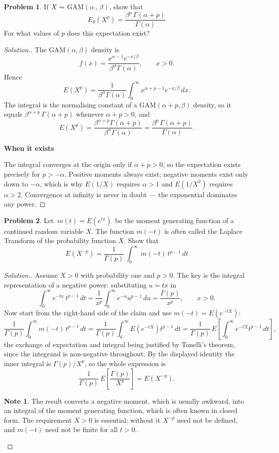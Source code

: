\documentclass[12pt,a4paper]{report}
\theoremstyle{definition}
\newtheorem*{note}{Note}
\newcommand{\subhead}[1]{%
  \par\medskip\noindent\textbf{#1}\par\nobreak\smallskip}
\newtheorem{problemx}{Problem}[section]
\newenvironment{problem}{\begin{problemx}}{\end{problemx}}
\newenvironment{solution}
  {\renewcommand{\qedsymbol}{}\begin{proof}[\textit{Solution}.]}
  {\end{proof}}
\begin{document}
\begin{problem}
\label{prob:gammamoments}
If $X\thicksim$ GAM$(\alpha\, , \, \beta)$, show that 
\[E_{\theta}\left(X^p\right) = \frac{\beta^p\, \Gamma\left(\alpha + p\right)}{\Gamma (\alpha)}\]
For what values of $p$ does this expectation exist?
\end{problem}

\begin{solution}
The GAM$(\alpha,\beta)$ density is
\[f(x) = \frac{x^{\alpha-1}e^{-x/\beta}}{\beta^{\alpha}\Gamma(\alpha)},\qquad x>0 .\]
Hence
\[E\left(X^{p}\right)
= \frac{1}{\beta^{\alpha}\Gamma(\alpha)}\int_0^{\infty} x^{\alpha+p-1}e^{-x/\beta}\,dx .\]
The integral is the normalising constant of a GAM$(\alpha+p,\beta)$ density, so
it equals $\beta^{\alpha+p}\,\Gamma(\alpha+p)$ whenever $\alpha+p>0$, and
\[E\left(X^{p}\right) = \frac{\beta^{\alpha+p}\Gamma(\alpha+p)}{\beta^{\alpha}\Gamma(\alpha)}
= \frac{\beta^{p}\,\Gamma(\alpha+p)}{\Gamma(\alpha)} .\]

\subhead{When it exists}
The integral converges at the origin only if $\alpha+p>0$, so the expectation
exists precisely for $p>-\alpha$. Positive moments always exist; negative moments
exist only down to $-\alpha$, which is why $E(1/X)$ requires $\alpha>1$ and
$E(1/X^{2})$ requires $\alpha>2$. Convergence at infinity is never in doubt --- the
exponential dominates any power.
\end{solution}

\begin{problem}
Let $\, m(t) = E\left(e^{tx}\right)\,$ be the moment generating function of a continued random variable $X$. The function $m(-t)$ is often called the Laplace Transform of the probability function $X$. Show that
\[E\left(X^{-p}\right) = \frac{1}{\Gamma (p)}\, \int_0^{\infty}\, m(-t)\, t^{p - 1}\, dt\]
\end{problem}

\begin{solution}
Assume $X>0$ with probability one and $p>0$. The key is the integral
representation of a negative power: substituting $u=tx$ in
\[\int_0^{\infty} e^{-tx}\,t^{p-1}\,dt
= \frac{1}{x^{p}}\int_0^{\infty}e^{-u}u^{p-1}\,du = \frac{\Gamma(p)}{x^{p}},
\qquad x>0 .\]
Now start from the right-hand side of the claim and use $m(-t)=E\left(e^{-tX}\right)$:
\[\frac{1}{\Gamma(p)}\int_0^{\infty} m(-t)\,t^{p-1}\,dt
= \frac{1}{\Gamma(p)}\int_0^{\infty} E\left(e^{-tX}\right) t^{p-1}\,dt
= \frac{1}{\Gamma(p)}\, E\left[\int_0^{\infty} e^{-tX}t^{p-1}\,dt\right],\]
the exchange of expectation and integral being justified by Tonelli's theorem,
since the integrand is non-negative throughout. By the displayed identity the
inner integral is $\Gamma(p)/X^{p}$, so the whole expression is
\[\frac{1}{\Gamma(p)}\,E\left[\frac{\Gamma(p)}{X^{p}}\right] = E\left(X^{-p}\right).\]

\begin{note}
The result converts a negative moment, which is usually awkward, into an
integral of the moment generating function, which is often known in closed form.
The requirement $X>0$ is essential: without it $X^{-p}$ need not be defined, and
$m(-t)$ need not be finite for all $t>0$.
\end{note}
\end{solution}
\end{document}
